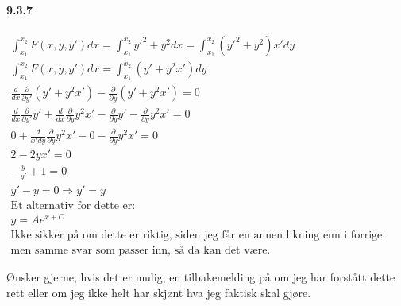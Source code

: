 \documentclass[11pt, A4paper,norsk]{article}
\begin{document}
		\paragraph{9.3.7}
			\begin{gather*}
\int_{x_1}^{x_2} F(x, y, y') dx = \int_{x_1}^{x_2} y'^2 + y^2 dx = \int_{x_1}^{x_2} \left( y'^2 + y^2 \right) x' dy \\
\int_{x_1}^{x_2} F(x, y, y') dx = \int_{x_1}^{x_2} \left( y' + y^2x' \right) dy \\
\frac{d}{dx} \frac{\partial}{\partial y'} \left( y' + y^2x' \right) - \frac{\partial}{\partial y} \left( y' + y^2x' \right) = 0 \\
\frac{d}{dx} \frac{\partial}{\partial y'} y' + \frac{d}{dx} \frac{\partial}{\partial y} y^2x' - \frac{\partial}{\partial y} y' - \frac{\partial}{\partial y} y^2 x' = 0 \\
0 + \frac{d}{x' dy} \frac{\partial}{\partial y} y^2x' - 0 - \frac{\partial}{\partial y} y^2 x' = 0 \\
2 - 2 y x' = 0 \\
- \frac{y}{y'} + 1 = 0 \\
y' - y = 0 \Rightarrow y' = y \\
\text{Et alternativ for dette er:} \\
y = A e^{x + C} \\
\text{Ikke sikker på om dette er riktig, siden jeg får en annen likning enn i forrige oppgaven,} \\
\text{men samme svar som passer inn, så da kan det være.}
			\end{gather*}






		\begin{flushleft}
Ønsker gjerne, hvis det er mulig, en tilbakemelding på om jeg har forstått dette rett eller om jeg ikke helt har skjønt hva jeg faktisk skal gjøre.
		\end{flushleft}
\end{document}
